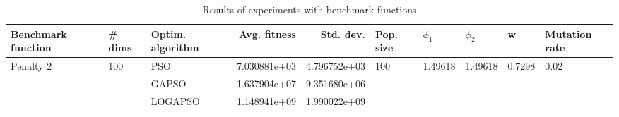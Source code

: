 \begin{table}
\centering
\caption{Results of experiments with benchmark functions}
\begin{tabular}{lllrrlllll}
\toprule
        Benchmark function &              \# dims & Optim. algorithm &  Avg. fitness &    Std. dev. &            Pop. size &               $\phi_{1}$ &               $\phi_{2}$ &                       w &         Mutation rate \\
\midrule
\multirow{3}{*}{Penalty 2} & \multirow{3}{*}{100} &              PSO &  7.030881e+03 & 4.796752e+03 & \multirow{3}{*}{100} & \multirow{3}{*}{1.49618} & \multirow{3}{*}{1.49618} & \multirow{3}{*}{0.7298} & \multirow{3}{*}{0.02} \\
                           &                      &            GAPSO &  1.637904e+07 & 9.351680e+06 &                      &                          &                          &                         &                       \\
                           &                      &          LOGAPSO &  1.148941e+09 & 1.990022e+09 &                      &                          &                          &                         &                       \\
\bottomrule
\end{tabular}
\end{table}
